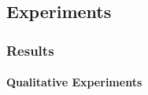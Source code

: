 \subsection*{Experiments}
\begin{frame}[t]
    \frametitle{Results}
    \framesubtitle{Qualitative Experiments}
    \begin{center}
        
    \end{center}
\end{frame}
%        
